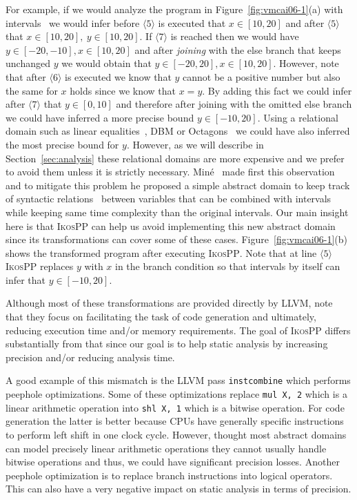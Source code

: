 \documentclass[a4]{article}
\newcommand{\ikospp}{\textsc{IkosPP}\xspace}
\begin{document}
For example, if we would analyze the program in
Figure~\ref{fig:vmcai06-1}(a) with intervals~\cite{intervals} we would
infer before $\langle 5 \rangle$ is executed that $x \in [10,20]$ and
after $\langle 5 \rangle$ that $x \in [10,20],~ y \in [10,20]$. If
$\langle 7 \rangle$ is reached then we would have $y \in [-20,-10],
x\in [10,20]$ and after \emph{joining} with the else branch that keeps
unchanged $y$ we would obtain that $y \in [-20,20], x\in
[10,20]$. However, note that after $\langle 6 \rangle$ is executed we
know that $y$ cannot be a positive number but also the same for $x$
holds since we know that $x = y$. By adding this fact we could infer
after $\langle 7 \rangle$ that $y \in [0,10]$ and therefore after
joining with the omitted else branch we could have inferred a more
precise bound $y \in [-10,20]$.
%
Using a relational domain such as linear equalities~\cite{Karr76},
DBM\cite{dbm} or Octagons~\cite{octagons} we could have also inferred
the most precise bound for $y$. However, as we will describe in
Section~\ref{sec:analysis} these relational domains are more expensive
and we prefer to avoid them unless it is strictly necessary.
%
Min\'{e}~\cite{Minevmcai06} made first this observation and to mitigate
this problem he proposed a simple abstract domain to keep track of
syntactic relations~\cite{Minevmcai06} between variables that can be
combined with intervals while keeping same time complexity than
the original intervals.
%
Our main insight here is that \ikospp can help us avoid implementing
this new abstract domain since its transformations can cover some of
these cases. Figure~\ref{fig:vmcai06-1}(b) shows the transformed
program after executing \ikospp. Note that at line $\langle 5 \rangle$
\ikospp replaces $y$ with $x$ in the branch condition so that
intervals by itself can infer that $y \in [-10,20]$.


Although most of these transformations are provided directly by LLVM,
note that they focus on facilitating the task of code generation and
ultimately, reducing execution time and/or memory requirements. The
goal of \ikospp differs substantially from that since our goal is to
help static analysis by increasing precision and/or reducing analysis
time.

A good example of this mismatch is the LLVM pass \texttt{instcombine}
which performs peephole optimizations. Some of these optimizations
replace \texttt{mul X, 2} which is a linear arithmetic operation into
\texttt{shl X, 1} which is a bitwise operation.  For code generation the latter is better
because CPUs have generally specific instructions to perform left
shift in one clock cycle. However, thought most abstract domains can
model precisely linear arithmetic operations they cannot usually
handle bitwise operations and thus, we could have significant
precision losses. Another peephole optimization is to replace branch
instructions into logical operators. This can also have a very
negative impact on static analysis in terms of precision.
 
\end{document}
